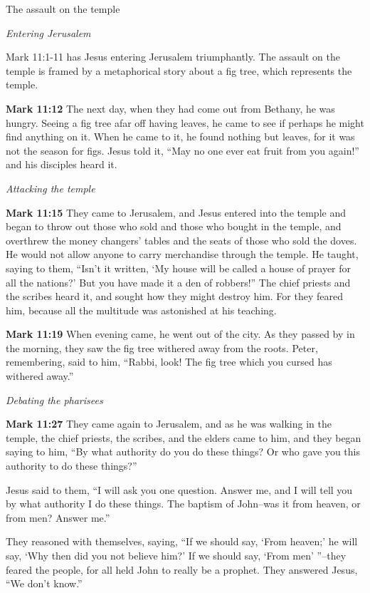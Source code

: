 \documentclass[10pt,twoside]{article} %
\newcommand{\quotesize}{\normalsize{}}
\newcommand{\comm}[1]{\begingroup \color{black!50} #1\endgroup}
\newenvironment{quotetext}{\begingroup\quotesize}{\endgroup}
\newcommand{\bible}[2]{\begin{quotetext}\textbf{#1} #2\end{quotetext}}
\newcommand{\gospelmark}[2]{\bible{Mark #1}{#2}}
\newcommand{\subhead}[1]{\emph{#1}\par}
\begin{document}
\begin{section}{The assault on the temple}

\subhead{Entering Jerusalem}

\comm{Mark 11:1-11 has Jesus entering Jerusalem triumphantly. The assault on the temple is framed by
a metaphorical story about a fig tree, which represents the temple.}

\gospelmark{11:12}{ The next day, when they had come out from Bethany, he was hungry.   Seeing a fig tree afar off having leaves, he came to see if perhaps he might find anything on it. When he came to it, he found nothing but leaves, for it was not the season for figs.   Jesus told it, ``May no one ever eat fruit from you again!'' and his disciples heard it. }

\subhead{Attacking the temple}

\gospelmark{11:15}{
They came to Jerusalem, and Jesus entered into the temple and began to throw out those who sold and those who bought in the temple, and overthrew the money changers' tables and the seats of those who sold the doves.   He would not allow anyone to carry merchandise through the temple.   He taught, saying to them, ``Isn't it written, `My house will be called a house of prayer for all the nations?' But you have made it a den of robbers!''
  The chief priests and the scribes heard it, and sought how they might destroy him. For they feared him, because all the multitude was astonished at his teaching. 
}

\gospelmark{11:19}{
When evening came, he went out of the city.   As they passed by in the morning, they saw the fig tree withered away from the roots.   Peter, remembering, said to him, ``Rabbi, look! The fig tree which you cursed has withered away.''
}

\subhead{Debating the pharisees}

\gospelmark{11:27}{
They came again to Jerusalem, and as he was walking in the temple, the chief priests, the scribes, and the elders came to him,   and they began saying to him, ``By what authority do you do these things? Or who gave you this authority to do these things?''

  Jesus said to them, ``I will ask you one question. Answer me, and I will tell you by what authority I do these things.    The baptism of John--was it from heaven, or from men? Answer me.''

  They reasoned with themselves, saying, ``If we should say, `From heaven;' he will say, `Why then did you not believe him?'   If we should say, `From men' ''--they feared the people, for all held John to really be a prophet.   They answered Jesus, ``We don't know.''

}
\end{section}
\end{document}
